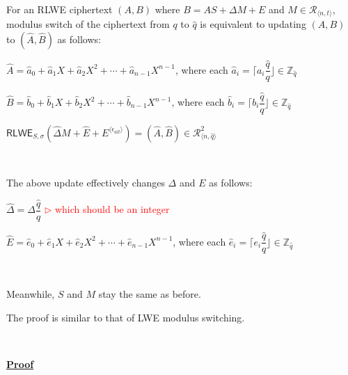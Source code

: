 \begin{tcolorbox}[title={\textbf{\tboxlabel{\ref*{subsec:modulus-switch-rlwe}} RLWE Modulus Switching}}]

For an RLWE ciphertext $(A, B)$ where $B = AS + \Delta M + E$ and $M \in \mathcal{R}_{\langle n, t \rangle}$, modulus switch of the ciphertext from $q$ to $\hat q$ is equivalent to updating $(A, B)$ to $(\hat A, \hat B)$ as follows:


$\hat{A} = \hat{a}_0 + \hat{a}_1X + \hat{a}_2X^2 + \cdots + \hat{a}_{n-1}X^{n-1}$, where each $\hat{a}_i = \Big\lceil a_i\dfrac{\hat{q}}{q} \Big\rfloor \in \mathbb{Z}_{\hat{q}}$ 

$\hat{B} = \hat{b}_0 + \hat{b}_1X + \hat{b}_2X^2 + \cdots + \hat{b}_{n-1}X^{n-1}$, where each $\hat{b}_i = \Big\lceil b_i\dfrac{\hat{q}}{q} \Big\rfloor \in \mathbb{Z}_{\hat{q}}$

$\textsf{RLWE}_{{S},\sigma}(\hat{\Delta}  M + \hat{E} + E^{\langle \epsilon_{\textit{all}} \rangle}) = (\hat{A}, \hat{B}) \in \mathcal{R}_{\langle n, \hat{q} \rangle}^{2}$ 

$ $

The above update effectively changes $\Delta$ and $E$ as follows:

$\hat{\Delta} = \Delta\dfrac{\hat{q}}{q}$ \textcolor{red}{ $\rhd$ which should be an integer}

$\hat{E} = \hat{e}_0 + \hat{e}_1X + \hat{e}_2X^2 + \cdots + \hat{e}_{n-1}X^{n-1}$, where each $\hat{e}_i = \Big\lceil e_i\dfrac{\hat{q}}{q} \Big\rfloor \in \mathbb{Z}_{\hat{q}}$

$ $

Meanwhile, $S$ and $M$ stay the same as before.

\end{tcolorbox}

The proof is similar to that of LWE modulus switching.

$ $

\textbf{\underline{Proof}}

